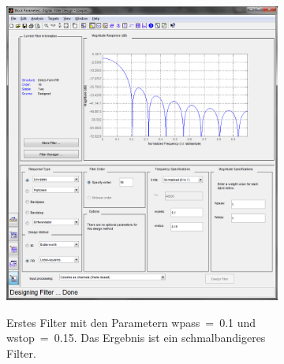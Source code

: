 \begin{figure} [h]
         \centering
         \caption{ Frequenzgänge der entworfenen Filter. Beide ähneln sich in den Parametern, verfügen jedoch über etwas unterschiedliche Eckfrequenzen. Als Entwurfsmethode wurde die sog. "Least-squares"-Methode verwendet. Diese Methode liefert gute Ergebnisse im Hinblick auf möglichst kleine Sidelobes und eine geringe Anzahl an Koeffizienten. }
         \label{fig:3}
%         
         \begin{subfigure}[t]{0.5\textwidth}
                 \centering
                 \includegraphics[width=\textwidth]{common/img/filter.png}
                 \vspace{.1cm}
                 \caption{Erstes Filter mit den Parametern wpass~=~0.1 und wstop~=~0.15. Das Ergebnis ist ein schmalbandigeres Filter. }
                 \label{fig:Filter1_A}\textit{}
         \end{subfigure}
%         
\qquad
         \begin{subfigure}[t]{0.5\textwidth}
                 \centering

\end{subfigure}
\end{figure}
